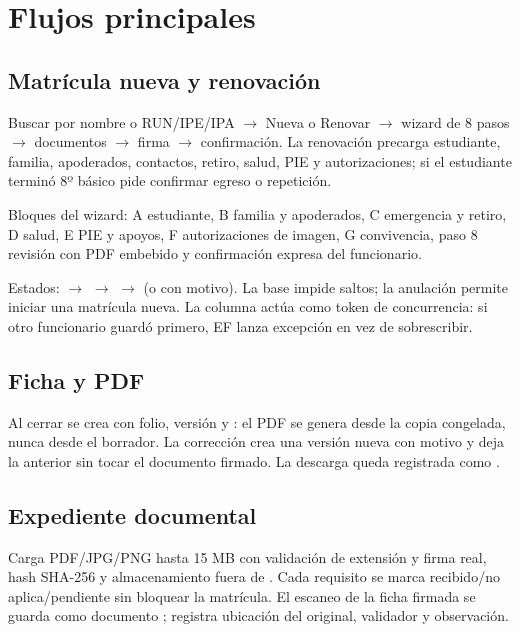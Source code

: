 \section{Flujos principales}

\subsection{Matrícula nueva y renovación}

Buscar por nombre o RUN/IPE/IPA $\rightarrow$ Nueva o Renovar $\rightarrow$
wizard de 8 pasos $\rightarrow$ documentos $\rightarrow$ firma $\rightarrow$
confirmación. La renovación precarga estudiante, familia, apoderados,
contactos, retiro, salud, PIE y autorizaciones; si el estudiante terminó
8º básico pide confirmar egreso o repetición.

Bloques del wizard: A estudiante, B familia y apoderados, C emergencia y
retiro, D salud, E PIE y apoyos, F autorizaciones de imagen, G convivencia,
paso 8 revisión con PDF embebido y confirmación expresa del funcionario.

Estados:  $\rightarrow$  $\rightarrow$
 $\rightarrow$  (o  con
motivo). La base impide saltos; la anulación permite iniciar una matrícula
nueva. La columna  actúa como token de concurrencia: si otro
funcionario guardó primero, EF lanza excepción en vez de sobrescribir.

\subsection{Ficha y PDF}

Al cerrar se crea  con folio, versión y
: el PDF se genera desde la copia congelada, nunca
desde el borrador. La corrección crea una versión nueva con motivo y deja la
anterior  sin tocar el documento firmado. La descarga
queda registrada como .

\subsection{Expediente documental}

Carga PDF/JPG/PNG hasta 15 MB con validación de extensión y firma real,
hash SHA-256 y almacenamiento fuera de . Cada requisito se
marca recibido/no aplica/pendiente sin bloquear la matrícula. El escaneo de
la ficha firmada se guarda como documento ;
 registra ubicación del
original, validador y observación.

